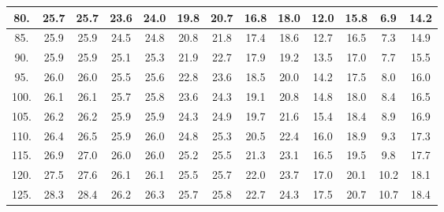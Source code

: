 \begin{tabular}{|c||c|c|c|c|c|c|c|c|c|c|c|c|}
\hline
  80. &    25.7 &    25.7 &    23.6 &    24.0 &    19.8 &    20.7 &    16.8 &    18.0 &    12.0 &    15.8 &     6.9 &    14.2\tabularnewline
\hline
  85. &    25.9 &    25.9 &    24.5 &    24.8 &    20.8 &    21.8 &    17.4 &    18.6 &    12.7 &    16.5 &     7.3 &    14.9\tabularnewline
\hline
  90. &    25.9 &    25.9 &    25.1 &    25.3 &    21.9 &    22.7 &    17.9 &    19.2 &    13.5 &    17.0 &     7.7 &    15.5\tabularnewline
\hline
  95. &    26.0 &    26.0 &    25.5 &    25.6 &    22.8 &    23.6 &    18.5 &    20.0 &    14.2 &    17.5 &     8.0 &    16.0\tabularnewline
\hline
 100. &    26.1 &    26.1 &    25.7 &    25.8 &    23.6 &    24.3 &    19.1 &    20.8 &    14.8 &    18.0 &     8.4 &    16.5\tabularnewline
\hline
 105. &    26.2 &    26.2 &    25.9 &    25.9 &    24.3 &    24.9 &    19.7 &    21.6 &    15.4 &    18.4 &     8.9 &    16.9\tabularnewline
\hline
 110. &    26.4 &    26.5 &    25.9 &    26.0 &    24.8 &    25.3 &    20.5 &    22.4 &    16.0 &    18.9 &     9.3 &    17.3\tabularnewline
\hline
 115. &    26.9 &    27.0 &    26.0 &    26.0 &    25.2 &    25.5 &    21.3 &    23.1 &    16.5 &    19.5 &     9.8 &    17.7\tabularnewline
\hline
 120. &    27.5 &    27.6 &    26.1 &    26.1 &    25.5 &    25.7 &    22.0 &    23.7 &    17.0 &    20.1 &    10.2 &    18.1\tabularnewline
\hline
 125. &    28.3 &    28.4 &    26.2 &    26.3 &    25.7 &    25.8 &    22.7 &    24.3 &    17.5 &    20.7 &    10.7 &    18.4\tabularnewline
\hline
\end{tabular}
